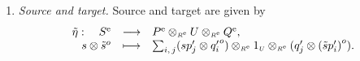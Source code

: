\documentclass[reqno, a4paper, 10pt]{amsart}
\numberwithin{equation}{section}
\theoremstyle{plain}
\theoremstyle{definition}
\theoremstyle{remark}
\begin{document}
\begin{enumerate}
\item {\em Source and target.}
Source and target are given by 
\begin{equation}
\label{Eq:tilde_eta} 
\begin{array}{rcl}
\tilde{\eta}: \quad {{S^{\rm e}}} &{ \longrightarrow  } & {{P^{\rm e}}} \otimes_{{\scriptscriptstyle{{R^{\rm e}}}}} U \otimes_{{\scriptscriptstyle{{R^{\rm e}}}}} {{Q^{\rm e}}}, \\
s \otimes {\tilde{{s}}}^o  &{ \longmapsto  } & \sum_{i,\, j} (sp'_j \otimes {q'_i}^o) \otimes_{{\scriptscriptstyle{{R^{\rm e}}}}} 1_{{\scriptscriptstyle{U}}} \otimes_{{\scriptscriptstyle{{R^{\rm e}}}}} (q'_j \otimes {({\tilde{{s}}}p'_i)}^o).  
\end{array}
\end{equation}


\end{enumerate}
\end{document}
